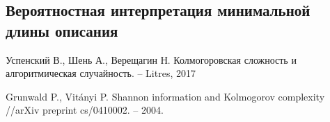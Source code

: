 \documentclass[../main.tex]{subfiles}
\begin{document}
\subsection{Вероятностная интерпретация минимальной длины описания}




\begin{thebibliography}{99}
	Успенский В., Шень А., Верещагин Н. Колмогоровская сложность и алгоритмическая случайность. – Litres, 2017

Grunwald P., Vitányi P. Shannon information and Kolmogorov complexity //arXiv preprint cs/0410002. – 2004.
\end{thebibliography}
\end{document}
